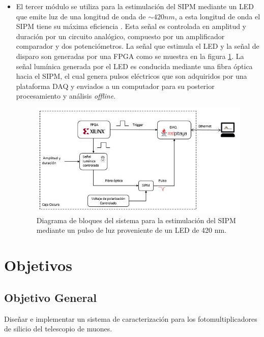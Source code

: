 \documentclass[11pt,letterpaper,oneside]{book}
\begin{document}
\begin{itemize}
\end{itemize}

\begin{itemize}
\item El tercer módulo se utiliza para la estimulación del SIPM mediante un LED que emite luz de una longitud de onda de $\sim 420nm$, a esta longitud de onda el SIPM tiene su máxima eficiencia \cite{Sipm_S13360_1350CS_datasheet}. Esta señal es controlada en amplitud y duración por un circuito analógico, compuesto por un amplificador comparador y dos potenciómetros. La señal que estimula el LED y la señal de disparo son generadas por una FPGA como se muestra en la figura \ref{LED}. La señal lumínica generada por el LED es conducida mediante una fibra óptica hacia el SIPM, el cual genera pulsos eléctricos que son adquiridos por una plataforma DAQ y enviados a un computador para su posterior procesamiento y análisis \textit{offline}.  


\begin{figure}[ht]
  \centering
  	\includegraphics[width=12cm]{Diagrama_led.JPG}
  	\caption{Diagrama de bloques del sistema para la estimulación del SIPM mediante un pulso de luz proveniente de un LED de 420 nm.}
	\label{LED}
\end{figure}

\end{itemize}
  

\newpage

\chapter{Objetivos}
\section{\textbf{Objetivo General}}
 
Diseñar e implementar un sistema de caracterización para los fotomultiplicadores de silicio del telescopio de muones. 
\end{document}
